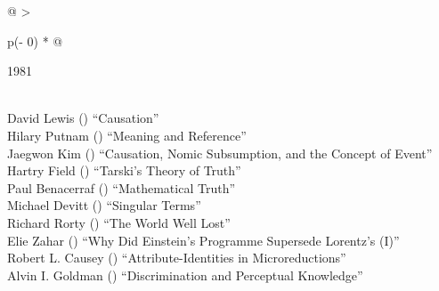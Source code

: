 \documentclass[
  10pt,
  letterpaper,
  DIV=11,
  numbers=noendperiod,
  twoside]{scrartcl}
\begin{document}
\begin{longtable}[]{@{}
  >{\raggedright\arraybackslash}p{(\columnwidth - 0\tabcolsep) * }@{}}

\caption{\label{tbl-top-ten-1972}Most cited articles published less than
ten years ago as of 1981.}

\tabularnewline

\toprule\noalign{}
\begin{minipage}[b]{\linewidth}\raggedright
1981
\end{minipage} \\
\midrule\noalign{}
\endhead
\bottomrule\noalign{}
\endlastfoot
David Lewis
()
``Causation'' \\
Hilary Putnam
()
``Meaning and Reference'' \\
Jaegwon Kim
()
``Causation, Nomic Subsumption, and the Concept of Event'' \\
Hartry Field
()
``Tarski's Theory of Truth'' \\
Paul Benacerraf
()
``Mathematical Truth'' \\
Michael Devitt
()
``Singular Terms'' \\
Richard Rorty
()
``The World Well Lost'' \\
Elie Zahar
()
``Why Did Einstein's Programme Supersede Lorentz's (I)'' \\
Robert L. Causey
()
``Attribute-Identities in Microreductions'' \\
Alvin I. Goldman
()
``Discrimination and Perceptual Knowledge'' \\

\end{longtable}
\end{document}
